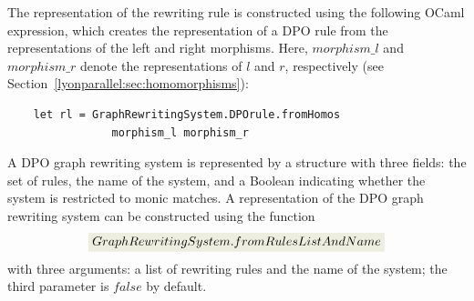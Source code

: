 \noindent The representation of the rewriting rule is constructed using the following OCaml expression, which creates the representation of a DPO rule from the representations of the left and right morphisms. Here, \colorbox{Ivory2}{$morphism\_l$} and \colorbox{Ivory2}{$morphism\_r$} denote the representations of $l$ and $r$, respectively (see Section~\ref{lyonparallel:sec:homomorphisms}):
\begin{lstlisting}
    let rl = GraphRewritingSystem.DPOrule.fromHomos 
                morphism_l morphism_r
\end{lstlisting}

A DPO graph rewriting system is represented by a structure with three fields: the set of rules, the name of the system, and a Boolean indicating whether the system is restricted to monic matches. A representation of the DPO graph rewriting system
can be constructed using the function 
$$\colorbox{Ivory2}{$GraphRewritingSystem.fromRulesListAndName$}$$ with three arguments: a list of rewriting rules and the name of the system; the third parameter is \colorbox{Ivory2}{$false$} by default.

